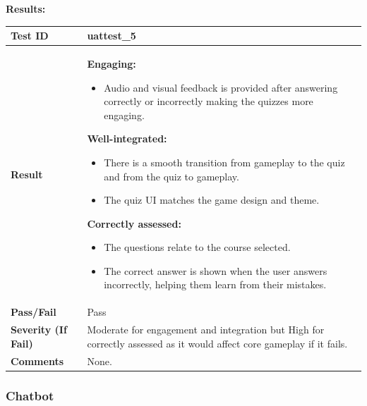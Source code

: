 \documentclass[11pt, a4paper]{article}
\begin{document}
\newpage

\noindent \textbf{Results:}

\begin{center}
\begin{tabularx}{\linewidth}{|>{\raggedright\arraybackslash}m{4cm}|X|}
    \hline
    \textbf{Test ID} & uattest\_5 \\
    \hline
    \textbf{Result} &
    \textbf{Engaging:}
    \begin{itemize}
        \item Audio and visual feedback is provided after answering correctly or incorrectly making the quizzes more engaging.
    \end{itemize}
    \textbf{Well-integrated:}
    \begin{itemize}
        \item There is a smooth transition from gameplay to the quiz and from the quiz to gameplay.
        \item The quiz UI matches the game design and theme.
    \end{itemize}
    \textbf{Correctly assessed:}
    \begin{itemize}
        \item The questions relate to the course selected.
        \item The correct answer is shown when the user answers incorrectly, helping them learn from their mistakes.
    \end{itemize}
    \\
    \hline
    \textbf{Pass/Fail} & Pass \\
    \hline
    \textbf{Severity (If Fail)} & Moderate for engagement and integration but High for correctly assessed as it would affect core gameplay if it fails. \\
    \hline
    \textbf{Comments} & None. \\
    \hline
\end{tabularx}
\end{center}

\newpage

\subsubsection{Chatbot}
\end{document}
